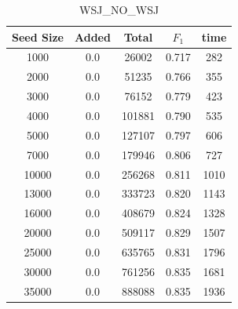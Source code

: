 \documentclass[journal, a4paper]{IEEEtran}
\begin{document}
	\begin{table}[!hbt]
		\begin{center}
		\caption{WSJ\_NO\_WSJ}
		\label{tab:1}
		\begin{tabular}{|c|c|c|c|c|}
			\hline
			Seed Size & Added & Total & $F_{1}$ & time\\ \hline
			  1000  & 0.0 & 26002 & 0.717 & 282\\ \hline
			  2000  & 0.0 & 51235 & 0.766 & 355\\ \hline
			  3000  & 0.0 & 76152 & 0.779 & 423\\ \hline
			  4000  & 0.0 & 101881 & 0.790 & 535\\ \hline
			  5000  & 0.0 & 127107 & 0.797 & 606\\ \hline
			  7000  & 0.0 & 179946 & 0.806 & 727\\ \hline
			  10000  & 0.0 & 256268 & 0.811 & 1010\\ \hline
			  13000  & 0.0 & 333723 & 0.820 & 1143\\ \hline
			  16000  & 0.0 & 408679 & 0.824 & 1328\\ \hline
			  20000  & 0.0 & 509117 & 0.829 & 1507\\ \hline
			  25000  & 0.0 & 635765 & 0.831 & 1796\\ \hline
			  30000  & 0.0 & 761256 & 0.835 & 1681\\ \hline
			  35000  & 0.0 & 888088 & 0.835 & 1936\\
			 \hline
		\end{tabular}
		\end{center}
		\vspace{-5mm}
	\end{table}
\end{document}
